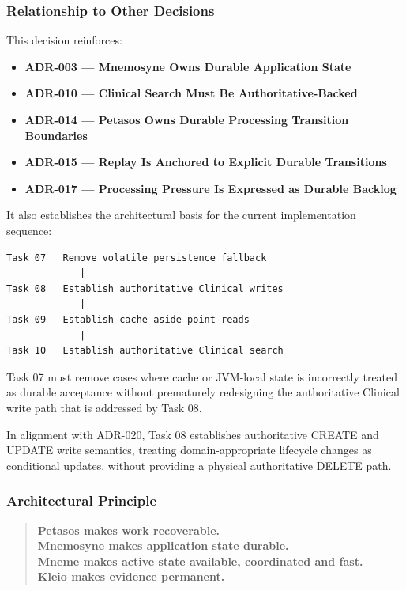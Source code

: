 \subsubsection{Relationship to Other Decisions}

This decision reinforces:
\begin{itemize}
    \item \textbf{ADR-003 --- Mnemosyne Owns Durable Application State}
    \item \textbf{ADR-010 --- Clinical Search Must Be Authoritative-Backed}
    \item \textbf{ADR-014 --- Petasos Owns Durable Processing Transition Boundaries}
    \item \textbf{ADR-015 --- Replay Is Anchored to Explicit Durable Transitions}
    \item \textbf{ADR-017 --- Processing Pressure Is Expressed as Durable Backlog}
\end{itemize}

It also establishes the architectural basis for the current implementation sequence:

\begin{verbatim}
Task 07   Remove volatile persistence fallback
             |
Task 08   Establish authoritative Clinical writes
             |
Task 09   Establish cache-aside point reads
             |
Task 10   Establish authoritative Clinical search
\end{verbatim}

Task 07 must remove cases where cache or JVM-local state is incorrectly treated as durable acceptance without prematurely redesigning the authoritative Clinical write path that is addressed by Task 08.

In alignment with ADR-020, Task 08 establishes authoritative CREATE and UPDATE write semantics, treating domain-appropriate lifecycle changes as conditional updates, without providing a physical authoritative DELETE path.

\subsubsection{Architectural Principle}

\begin{quote}
    \textbf{Petasos makes work recoverable.}\\
    \textbf{Mnemosyne makes application state durable.}\\
    \textbf{Mneme makes active state available, coordinated and fast.}\\
    \textbf{Kleio makes evidence permanent.}
\end{quote}

